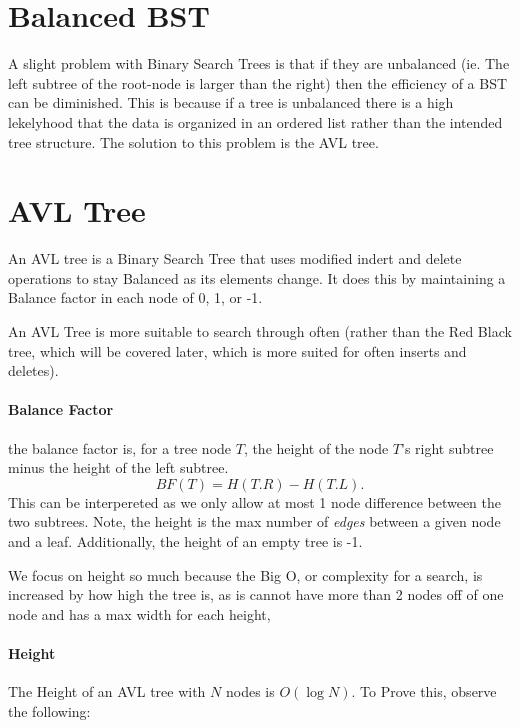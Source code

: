 \documentclass[12pt]{book}
\title{\coursetitle\linebreak\lecturename}
\author{\\Cain Susko\\ 
           \\ \\ \\
      Queen's University 
    \\School of Computing\\}
\begin{document}
\begin{titlepage}
        \maketitle
\end{titlepage}


\section*{Balanced BST}
A slight problem with Binary Search Trees is that if they are unbalanced (ie. The 
left subtree of the root-node is larger than the right) then the efficiency 
of a BST can be diminished. 
This is because if a tree is unbalanced there is a high lekelyhood that
the data is organized in an ordered list rather than the intended tree structure.
The solution to this problem is the AVL tree.

\section*{AVL Tree}
An AVL tree is a Binary Search Tree that uses modified indert and delete operations
to stay Balanced as its elements change. It does this by maintaining a Balance 
factor in each node of 0, 1, or -1.

An AVL Tree is more suitable to search through often (rather than the Red Black tree,
which will be covered later, which is more suited for often inserts and deletes).

\paragraph{Balance Factor}
the balance factor is, for a tree node $T$, the height of the node  $T$'s right
subtree minus the height of the left subtree.
 \[
BF(T) = H(T.R) - H(T.L)
.\] 
This can be interpereted as we only allow at most 1 node difference between the 
two subtrees. Note, the height is the max number of \textit{edges} between a given
node and a leaf. Additionally, the height of an empty tree is -1.

We focus on height so much because the Big O, or complexity for a search, is increased
by how high the tree is, as is  cannot have more than 2 nodes off of one node and 
has a max width for each height,

\paragraph{Height}
The Height of an AVL tree with $N$ nodes is  $O(\log N)$. To Prove this, observe the 
following:
\end{document}
